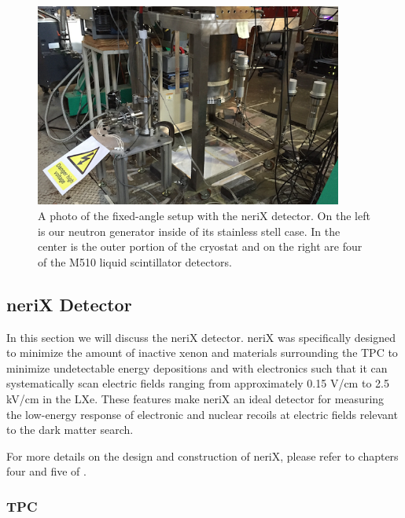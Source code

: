 \begin{figure}[bt]
        \centering
	\includegraphics[width=0.9\textwidth]{nerix_experimental_setup}
	\caption{A photo of the fixed-angle setup with the neriX detector.  On the left is our neutron generator inside of its stainless stell case.  In the center is the outer portion of the cryostat and on the right are four of the M510 liquid scintillator detectors.}
	\label{fig:nerix_experimental_setup}
\end{figure}



\subsection{neriX Detector}

In this section we will discuss the neriX detector.  neriX was specifically designed to minimize the amount of inactive xenon and materials surrounding the TPC to minimize undetectable energy depositions and with electronics such that it can systematically scan electric fields ranging from approximately 0.15 V/cm to 2.5 kV/cm in the LXe.  These features make neriX an ideal detector for measuring the low-energy response of electronic and nuclear recoils at electric fields relevant to the dark matter search.

For more details on the design and construction of neriX, please refer to chapters four and five of .

\subsubsection{TPC}

